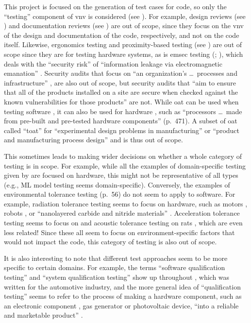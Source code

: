 This project is focused on the generation of test cases for code, so only
the ``testing'' component of \acf{vnv} is considered (see ).
For example, design reviews (see \citealp[p.~132]{IEEE2017}) and
documentation reviews (see \citealp[p.~144]{IEEE2017}) are out of scope,
since they focus on the \acs{vnv} of the design and documentation of the code,
respectively, and not on the code itself. Likewise, ergonomics testing
and proximity-based testing (see \citealpISTQB{}) are out of scope since
they are for testing hardware systems, as is \acf{emsec} testing
(\citealp{ISO2021}; \citealp[p.~95]{ZhouEtAl2012}), which deals with the
``security risk'' of ``information leakage via electromagnetic emanation''
\citep[p.~95]{ZhouEtAl2012}. Security audits that focus on ``an organization's
\dots\ processes and infrastructure'' \citepISTQB{}, are also out of scope,
but security audits that ``aim to ensure that all of the products installed on
a site are secure when checked against the known vulnerabilities for those
products'' \citep[p.~28]{Gerrard2000b} are not. While \acf{oat}
can be used when testing software \citep{Mandl1985}, it can also be used for
hardware \citep[pp.~471-472]{Valcheva2013}, such as ``processors \dots\ made
from pre-built and pre-tested hardware components'' (p.~471). A subset of
\acs{oat} called ``\acf{toat}'' for ``experimental design problems in
manufacturing'' \citep[p.~1573]{YuEtAl2011} or ``product and manufacturing
process design'' \cite[p.~44]{Tsui2007} and is thus out of scope.

This sometimes leads to making wider decisions on whether a whole category of
testing is in scope. For example, while all the examples of domain-specific
testing given by \citet[p.~26]{Firesmith2015} are focused on hardware, this
might not be representative of all types (e.g., ML model testing seems
domain-specific). Conversely, the examples of environmental tolerance testing
(p.~56) do not seem to apply to software. For example, radiation tolerance
testing seems to focus on hardware, such as motors \citep{MukhinEtAl2022},
robots \citep{ZhangEtAl2020}, or ``nanolayered carbide and nitride materials''
\citep[p.~1]{TunesEtAl2022}. Acceleration tolerance testing seems to focus on
\accelTolTest{} and acoustic tolerance testing on rats \citep{HolleyEtAl1996},
which are even less related! Since these all seem to focus on
environment-specific factors that would not impact the code, this category of
testing is also out of scope.

It is also interesting to note that different test approaches seem to be more
specific to certain domains. For example, the terms ``software qualification
testing'' and ``system qualification testing'' show up throughout
\citep{SPICE2022}, which was written for the automotive industry, and the more
general idea of ``qualification testing'' seems to refer to the process of
making a hardware component, such as an electronic component
\citep{AhsanEtAl2020}, gas generator \citep{ParateEtAl2021} or photovoltaic
device, ``into a reliable and marketable product'' \citep[p.~1]{SuhirEtAl2013}.

